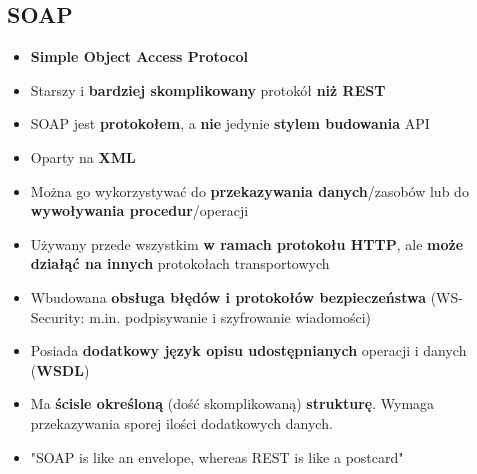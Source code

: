 \documentclass[../main.tex]{subfiles}
\begin{document}
    \subsection{SOAP}
    \begin{itemize}
        \item \textbf{Simple Object Access Protocol}
        \item Starszy i \textbf{bardziej skomplikowany} protokół \textbf{niż REST}
        \item SOAP jest \textbf{protokołem}, a \textbf{nie} jedynie \textbf{stylem budowania} API
        \item Oparty na \textbf{XML}
        \item Można go wykorzystywać do \textbf{przekazywania danych}/zasobów lub do \textbf{wywoływania procedur}/operacji
        \item Używany przede wszystkim \textbf{w ramach protokołu HTTP}, ale \textbf{może działąć na innych} protokołach
        transportowych
        \item Wbudowana \textbf{obsługa błędów i protokołów bezpieczeństwa} (WS-Security: m.in. podpisywanie i
        szyfrowanie wiadomości)
        \item Posiada \textbf{dodatkowy język opisu udostępnianych} operacji i danych (\textbf{WSDL})
        \item Ma \textbf{ścisle określoną} (dość skomplikowaną) \textbf{strukturę}. Wymaga przekazywania
        sporej ilości dodatkowych danych.
        \item "SOAP is like an envelope, whereas REST is like a postcard"
    \end{itemize}
\end{document}
